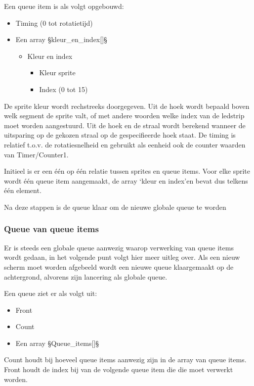 \documentclass[12pt]{ugentreport}
\begin{document}
Een queue item is als volgt opgebouwd:
\begin{itemize}
	\item Timing (0 tot rotatietijd)
	\item Een array §kleur_en_index[]§
	\begin{itemize}
		\item Kleur en index
			\begin{itemize}
				\item Kleur sprite
				\item Index (0 tot 15)
			\end{itemize}
	\end{itemize}
\end{itemize}

De sprite kleur wordt rechstreeks doorgegeven. Uit de hoek wordt bepaald boven welk segment de sprite valt, of met andere woorden welke 
index van de ledstrip moet worden aangestuurd. Uit de hoek en de straal wordt berekend wanneer de uitsparing op de gekozen straal op de 
gespecifieerde hoek staat. De timing is relatief t.o.v. de rotatiesnelheid en gebruikt als eenheid ook de counter waarden van Timer/Counter1.

Initieel is er een één op één relatie tussen sprites en queue items. Voor elke sprite wordt één queue item aangemaakt, de array ‘kleur 
en index’en bevat dus telkens één element.

Na deze stappen is de queue klaar om de nieuwe globale queue te worden


\subsubsection{Queue van queue items}
Er is steeds een globale queue aanwezig waarop verwerking van queue items wordt gedaan, in het volgende punt volgt hier meer uitleg 
over. Als een nieuw scherm moet worden afgebeeld wordt een nieuwe queue klaargemaakt op de achtergrond, alvorens zijn lancering als 
globale queue.

Een queue ziet er als volgt uit:
\begin{itemize}
	\item Front
	\item Count
	\item Een array §Queue_items[]§
\end{itemize}

Count houdt bij hoeveel queue items aanwezig zijn in de array van queue items. Front houdt de index bij van de volgende queue item die 
die moet verwerkt worden.
\end{document}
